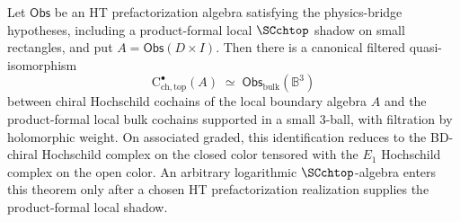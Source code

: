 \begin{theorem}
\label{thm:bulk-CHC-brace}
Let $\mathsf{Obs}$ be an HT prefactorization algebra satisfying the
physics-bridge hypotheses, including a product-formal local
$\SCchtop$ shadow on small rectangles, and put
$A=\mathsf{Obs}(D\times I)$. Then there is a canonical filtered
quasi-isomorphism
\[
\mathrm{C}^\bullet_{\mathrm{ch,top}}(A)\;\simeq\;\mathsf{Obs}_{\mathrm{bulk}}(\mathbb{B}^3)
\]
between chiral Hochschild cochains of the local boundary algebra $A$
and the product-formal local bulk cochains supported in a small
$3$-ball, with filtration by holomorphic weight. On associated
graded, this identification reduces to the BD-chiral Hochschild complex
on the closed color tensored with the $E_1$ Hochschild complex on the
open color. An arbitrary logarithmic $\SCchtop$-algebra enters this
theorem only after a chosen HT prefactorization realization supplies
the product-formal local shadow.
\end{theorem}

